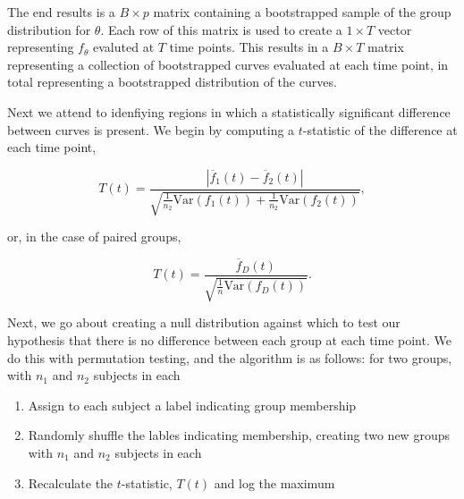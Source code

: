 \documentclass{article}
\begin{document}
The end results is a $B \times p$ matrix containing a bootstrapped sample of the group distribution for $\theta$. Each row of this matrix is used to create a $1 \times T$ vector representing $f_{\theta}$ evaluted at $T$ time points. This results in a $B \times T$ matrix representing a collection of bootstrapped curves evaluated at each time point, in total representing a bootstrapped distribution of the curves.



Next we attend to idenfiying regions in which a statistically significant difference between curves is present. We begin by computing a $t$-statistic of the difference at each time point, 

\begin{equation}
T(t) = \frac{|\overline{f}_1(t) - \overline{f}_2(t)|}{\sqrt{\frac{1}{n_2} \text{Var}(f_1(t)) + \frac{1}{n_2} \text{Var}(f_2(t))}},
\end{equation}

or, in the case of paired groups, 

\begin{equation}
T(t) = \frac{\overline{f}_D(t)}{\sqrt{\frac1n \text{Var}(f_D(t))}}.
\end{equation}

Next, we go about creating a null distribution against which to test our hypothesis that there is no difference between each group at each time point. We do this with permutation testing, and the algorithm is as follows: for two groups, with $n_1$ and $n_2$ subjects in each

\begin{enumerate}
	\item Assign to each subject a label indicating group membership
	\item Randomly shuffle the lables indicating membership, creating two new groups with $n_1$ and $n_2$ subjects in each
	\item Recalculate the $t$-statistic, $T(t)$ and log the maximum
\end{enumerate}
\end{document}
